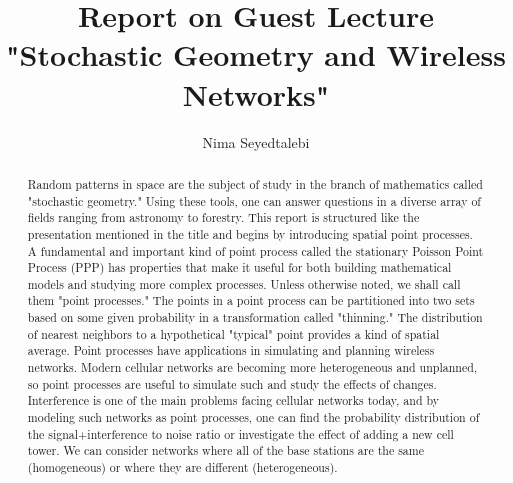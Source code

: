 \documentclass[]{article}
\title{Report on Guest Lecture "Stochastic Geometry and Wireless Networks"}
\author{Nima Seyedtalebi}
\begin{document}
\maketitle

\begin{abstract}
Random patterns in space are the subject of study in the branch of mathematics called "stochastic geometry." Using these tools, one can answer questions in a diverse array of fields ranging from astronomy to forestry. This report is structured like the presentation mentioned in the title and begins by introducing spatial point processes. A fundamental and important kind of point process called the stationary Poisson Point Process (PPP) has properties that make it useful for both building mathematical models and studying more complex processes. Unless otherwise noted, we shall call them "point processes." The points in a point process can be partitioned into two sets based on some given probability in a transformation called "thinning." The distribution of nearest neighbors to a hypothetical "typical" point provides a kind of spatial average.
Point processes have applications in simulating and planning wireless networks. Modern cellular networks are becoming more heterogeneous and unplanned, so point processes are useful to simulate such and study the effects of changes. Interference is one of the main problems facing cellular networks today, and by modeling such networks as point processes, one can find the probability distribution of the signal+interference to noise ratio or investigate the effect of adding a new cell tower. We can consider networks where all of the base stations are the same (homogeneous) or where they are different (heterogeneous).
\end{abstract}
\end{document}
